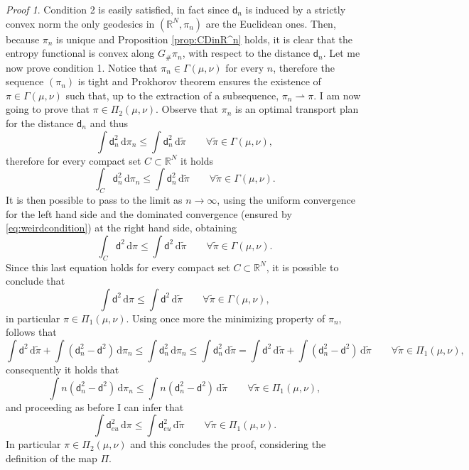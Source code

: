 \documentclass[11pt,twoside,a4paper]{article}
\newcommand{\R}{\mathbb{R}}
\newcommand{\de}{\ensuremath{\, \mathrm d}} %
\newcommand{\weakto}{\rightharpoonup}
\newcommand{\thmsymbol}{\( \square \)}
\newcommand{\di}{\mathsf d} %
\theoremstyle{theorem}
\theoremstyle{definition}
\theoremstyle{remark}
\theoremstyle{proof}
\newtheorem*{pro}{Proof}
\newenvironment{pr}{\begin{pro}%
 \renewcommand{\qedsymbol}{\thmsymbol}\pushQED{\qed}}%
 {\popQED\end{pro}}
\begin{document}
 
\begin{pr}
Condition 2 is easily satisfied, in fact since $\di_n$ is induced by a strictly convex norm the only geodesics in $(\R^N,\pi_n)$ are the Euclidean ones. Then, because $\pi_n$ is unique and Proposition \ref{prop:CDinR^n} holds, it is clear that the entropy functional is convex along $G_\#\pi_n$, with respect to the distance $\di_n$. 
Let me now prove condition 1. Notice that $\pi_n \in \Gamma(\mu,\nu)$ for every $n$, therefore the sequence $(\pi_n)$ is tight and Prokhorov theorem ensures the existence of $\pi\in \Gamma(\mu,\nu)$ such that, up to the extraction of a subsequence, $\pi_n\weakto \pi$. I am now going to prove that $\pi \in \Pi_2(\mu,\nu)$. Observe that $\pi_n$ is an optimal transport plan for the distance $\di_n$ and thus 
\begin{equation*}
    \int \di_n^2 \de \pi_n \leq \int \di_n^2 \de \tilde \pi \qquad \forall \tilde \pi \in \Gamma(\mu,\nu),
\end{equation*}
therefore for every compact set $C\subset \R^N$ it holds
\begin{equation*}
    \int_C \di_n^2 \de \pi_n \leq \int \di_n^2 \de \tilde \pi \qquad \forall \tilde \pi \in \Gamma(\mu,\nu).
\end{equation*}
It is then possible to pass to the limit as $n\to\infty$, using the uniform convergence for the left hand side and the dominated convergence (ensured by \eqref{eq:weirdcondition}) at the right hand side, obtaining 
\begin{equation*}
    \int_C \di^2 \de \pi \leq \int \di^2 \de \tilde \pi \qquad \forall \tilde \pi \in \Gamma(\mu,\nu).
\end{equation*}
Since this last equation holds for every compact set $C \subset \R^N$, it is possible to conclude that 
\begin{equation*}
    \int \di^2 \de \pi \leq \int \di^2 \de \tilde \pi \qquad \forall \tilde \pi \in \Gamma(\mu,\nu),
\end{equation*}
in particular $\pi \in \Pi_1(\mu,\nu)$. Using once more the minimizing property of $\pi_n$, follows that
\begin{equation*}
    \int \di^2 \de \tilde \pi + \int (\di_n^2- \di^2) \de \pi_n \leq \int \di_n^2 \de \pi_n \leq \int \di_n^2 \de \tilde \pi = \int \di^2 \de \tilde \pi + \int (\di_n^2- \di^2) \de \tilde \pi \qquad \forall \tilde \pi \in \Pi_1(\mu,\nu),
\end{equation*}
consequently it holds that
\begin{equation*}
    \int n(\di_n^2- \di^2) \de \pi_n \leq \int n(\di_n^2- \di^2) \de \tilde \pi \qquad \forall \tilde \pi \in \Pi_1(\mu,\nu),
\end{equation*}
and proceeding as before I can infer that
\begin{equation*}
    \int \di^2_{eu} \de \pi \leq \int \di^2_{eu} \de \tilde \pi \qquad \forall \tilde \pi \in \Pi_1(\mu,\nu).
\end{equation*}
In particular $\pi\in \Pi_2(\mu,\nu)$ and this concludes the proof, considering the definition of the map $\Pi$.
\end{pr} 
\end{document}

